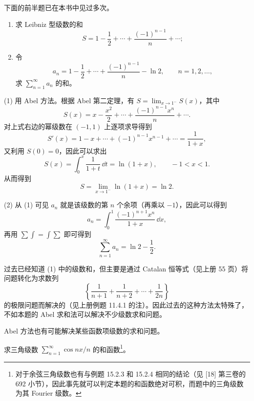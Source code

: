 下面的前半题已在本书中见过多次。

\begin{xexample}[16.2.4]
\begin{enumerate}[label=(\arabic*)]
\item 求 Leibniz 型级数的和
\[
  S=1-\frac12+\cdots+\frac{(-1)^{n-1}}n+\cdots;
\]
\item 令
\[
  a_n=1-\frac12+\cdots+\frac{(-1)^{n-1}}n-\ln2,
  \qquad n=1,2,\ldots,
\]
求 $\sum_{n=1}^{\infty}a_n$ 的和。
\end{enumerate}
\end{xexample}

\begin{xsolution}
(1) 用 Abel 方法。根据 Abel 第二定理，有 $S=\lim_{x\to1^-}S(x)$，其中
\[
  S(x)=x-\frac{x^2}{2}+\cdots+\frac{(-1)^{n-1}x^n}{n}+\cdots.
\]
对上式右边的幂级数在 $(-1,1)$ 上逐项求导得到
\[
  S'(x)=1-x+\cdots+(-1)^{n-1}x^{n-1}+\cdots=\frac1{1+x},
\]
又利用 $S(0)=0$，因此可以求出
\[
  S(x)=\int_0^x\frac1{1+t}\,\dd t=\ln(1+x),\qquad -1<x<1.
\]
从而得到
\[
  S=\lim_{x\to1^-}\ln(1+x)=\ln2.
\]

(2) 从 (1) 可见 $a_n$ 就是该级数的第 $n$ 个余项（再乘以 $-1$），因此可以得到
\[
  a_n=\int_0^1\frac{(-1)^{n+1}x^n}{1+x}\,\dd x,
\]
再用 $\sum\int=\int\sum$ 即可得到
\[
  \sum_{n=1}^{\infty}a_n=\ln2-\frac12.
\]
\end{xsolution}

\begin{xremark}
过去已经知道 (1) 中的级数和，但主要是通过 Catalan 恒等式（见上册 55 页）将问题转化为求数列
\[
  \left\{\frac1{n+1}+\frac1{n+2}+\cdots+\frac1{2n}\right\}
\]
的极限问题而解决的（见上册例题 11.4.1 的注）。因此过去的这种方法太特殊了，不如本题的 Abel 求和法可以解决不少级数求和问题。
\end{xremark}

Abel 方法也有可能解决某些函数项级数的求和问题。

\begin{xexample}[16.2.5]
求三角级数 $\sum_{n=1}^{\infty}\cos nx/n$ 的和函数\footnote{对于余弦三角级数也有与例题 15.2.3 和 15.2.4 相同的结论（见 [18] 第三卷的 692 小节），因此事先就可以判定本题的和函数绝对可积，而题中的三角级数为其 Fourier 级数。}。
\end{xexample}

